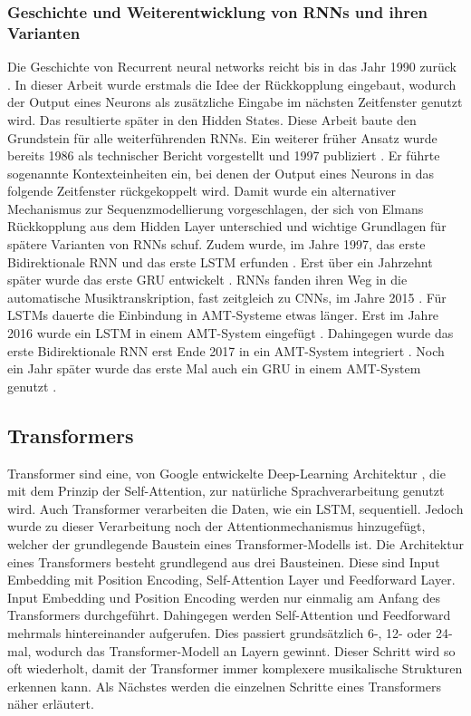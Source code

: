 \subsubsection{Geschichte und Weiterentwicklung von RNNs und ihren Varianten}
Die Geschichte von Recurrent neural networks reicht bis in das Jahr 1990 zurück \cite{elman1990finding}.
In dieser Arbeit wurde erstmals die Idee der Rückkopplung eingebaut,
wodurch der Output eines Neurons als zusätzliche Eingabe im nächsten Zeitfenster genutzt wird.
Das resultierte später in den Hidden States.
Diese Arbeit baute den Grundstein für alle weiterführenden RNNs.
Ein weiterer früher Ansatz wurde bereits 1986 als technischer Bericht vorgestellt und 1997 publiziert \cite{jordan1997serial}.
Er führte sogenannte Kontexteinheiten ein, bei denen der Output eines Neurons in das folgende Zeitfenster rückgekoppelt wird.
Damit wurde ein alternativer Mechanismus zur Sequenzmodellierung vorgeschlagen,
der sich von Elmans Rückkopplung aus dem Hidden Layer unterschied und wichtige Grundlagen für spätere Varianten von RNNs schuf.
Zudem wurde, im Jahre 1997, das erste Bidirektionale RNN \cite{schuster1997bidirectional}
und das erste LSTM erfunden \cite{hochreiter1997long}.
Erst über ein Jahrzehnt später wurde das erste GRU entwickelt \cite{chung2014empirical}.
RNNs fanden ihren Weg in die automatische Musiktranskription, fast zeitgleich zu CNNs, im Jahre 2015 \cite{sigtia2015hybrid}.
Für LSTMs dauerte die Einbindung in AMT-Systeme etwas länger.
Erst im Jahre 2016 wurde ein LSTM in einem AMT-System eingefügt \cite{sigtia2016end}.
Dahingegen wurde das erste Bidirektionale RNN erst Ende 2017 in ein AMT-System integriert \cite{hawthorne2017onsets}.
Noch ein Jahr später wurde das erste Mal auch ein GRU in einem AMT-System genutzt \cite{jung2018adaptive}.

\subsection{Transformers}
Transformer sind eine, von Google entwickelte Deep-Learning Architektur \cite{vaswani2017attention},
die mit dem Prinzip der Self-Attention, zur natürliche Sprachverarbeitung genutzt wird.
Auch Transformer verarbeiten die Daten, wie ein LSTM, sequentiell.
Jedoch wurde zu dieser Verarbeitung noch der Attentionmechanismus hinzugefügt,
welcher der grundlegende Baustein eines Transformer-Modells ist.
Die Architektur eines Transformers besteht grundlegend aus drei Bausteinen.
Diese sind Input Embedding mit Position Encoding, Self-Attention Layer und Feedforward Layer.
Input Embedding und Position Encoding werden nur einmalig am Anfang des Transformers durchgeführt.
Dahingegen werden Self-Attention und Feedforward mehrmals hintereinander aufgerufen.
Dies passiert grundsätzlich 6-, 12- oder 24-mal, wodurch das Transformer-Modell an Layern gewinnt.
Dieser Schritt wird so oft wiederholt, damit der Transformer immer komplexere musikalische Strukturen erkennen kann.
Als Nächstes werden die einzelnen Schritte eines Transformers näher erläutert.

